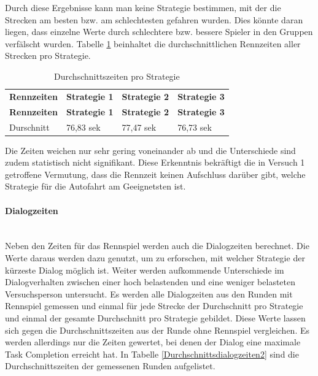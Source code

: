 \documentclass[12pt,a4paper]{scrartcl}
\begin{document}
Durch diese Ergebnisse kann man keine Strategie bestimmen, mit der die Strecken am besten bzw. am schlechtesten gefahren wurden.
Dies könnte daran liegen, dass einzelne Werte durch schlechtere bzw. bessere Spieler in den Gruppen verfälscht wurden. Tabelle \ref{RennZeitenDis2} beinhaltet die durchschnittlichen Rennzeiten aller Strecken pro Strategie. 

\begin{longtable}{p{3cm}p{3cm}p{3cm}p{3cm} }
	\label{RennZeitenDis2}\\
	\caption[Durchschnittszeiten pro Strategie]{Durchschnittszeiten pro Strategie}\\
	\hline
	\textbf{Rennzeiten}&\textbf{Strategie 1}&\textbf{Strategie 2} &\textbf{Strategie 3}\\
	\hline
	\endfirsthead
	\hline
	\textbf{Rennzeiten}&\textbf{Strategie 1}&\textbf{Strategie 2} &\textbf{Strategie 3}\\
	\hline
	\endhead
Durschnitt & 76,83 sek & 77,47 sek & 76,73 sek \\
\hline
\end{longtable}
Die Zeiten weichen nur sehr gering voneinander ab und die Unterschiede sind zudem statistisch nicht signifikant. Diese Erkenntnis bekräftigt die in Versuch 1 getroffene Vermutung, dass die Rennzeit keinen Aufschluss darüber gibt, welche Strategie für die Autofahrt am Geeignetsten ist. 

\paragraph{Dialogzeiten}
~\\
Neben den Zeiten für das Rennspiel werden auch die Dialogzeiten berechnet. 
Die Werte daraus werden dazu genutzt, um zu erforschen, mit welcher Strategie der kürzeste Dialog möglich ist. Weiter werden aufkommende Unterschiede im Dialogverhalten zwischen einer hoch belastenden und eine weniger belasteten Versuchsperson untersucht. 
Es werden alle Dialogzeiten aus den Runden mit Rennspiel gemessen und einmal für jede Strecke der Durchschnitt pro Strategie und einmal der gesamte Durchschnitt pro Strategie gebildet. Diese Werte lassen sich gegen die Durchschnittszeiten aus der Runde ohne Rennspiel vergleichen. Es werden allerdings nur die Zeiten gewertet, bei denen der Dialog eine maximale Task Completion erreicht hat.
In Tabelle \ref{Durchschnittsdialogzeiten2} sind die Durchschnittszeiten der gemessenen Runden aufgelistet.
\end{document}
